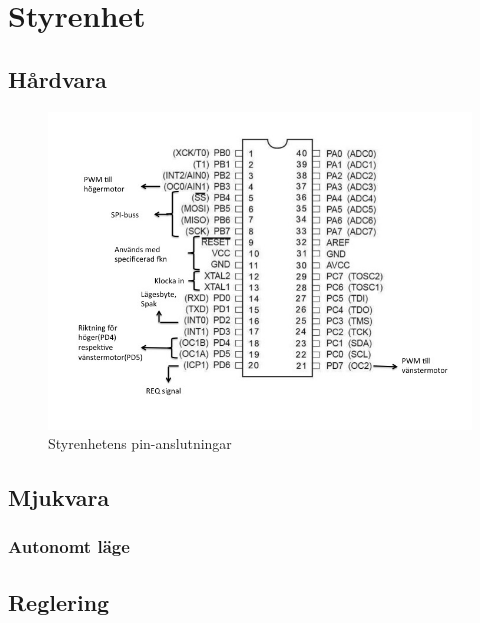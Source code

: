 \section{Styrenhet}

\subsection{Hårdvara}

\begin{figure}[H]
  \centering
 \includegraphics[angle=0,scale=0.5]{bilder/PIN_styr.jpg}
  \caption{Styrenhetens pin-anslutningar}
  \label{fig:PINstyr}
\end{figure}


\subsection{Mjukvara}

\subsubsection{Autonomt läge}

\subsection{Reglering}
\label{reglering}
